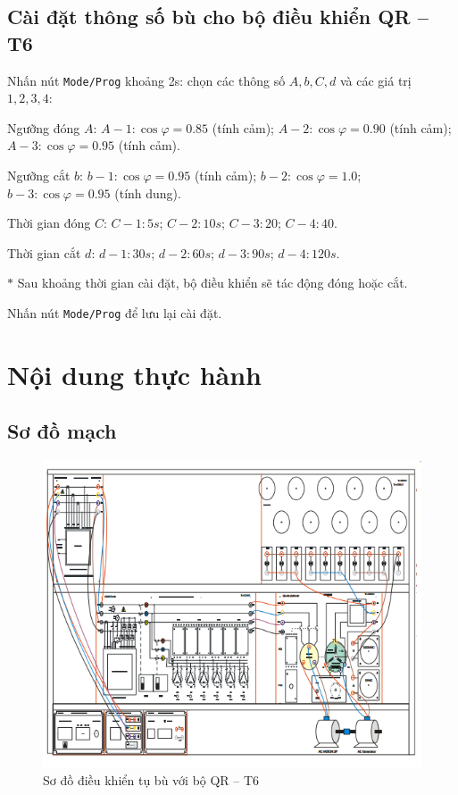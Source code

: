 \documentclass[13pt,a4paper]{extarticle}
\begin{document}
\subsection{Cài đặt thông số bù cho bộ điều khiển QR -- T6}
Nhấn nút \verb|Mode/Prog| khoảng 2s: chọn các thông số $A,b,C,d$ và các giá trị $1,2,3,4$:
\begin{list}{--}{}
\item Ngưỡng đóng $A$: $A-1:\cos \varphi  = 0.85$ (tính cảm); $A-2:\cos \varphi  = 0.90$ (tính cảm); $A-3:\cos \varphi  = 0.95$ (tính cảm).
\item Ngưỡng cắt $b$: $b-1:\cos \varphi  = 0.95$ (tính cảm); $b-2:\cos \varphi  = 1.0$; $b-3:\cos \varphi  = 0.95$ (tính dung).
\item Thời gian đóng $C$: $C-1:5s$; $C-2:10s$; $C-3:20$; $C-4:40$.
\item Thời gian cắt $d$: $d-1:30s$; $d-2:60s$; $d-3:90s$; $d-4:120s$.
\item[$\ast$] Sau khoảng thời gian cài đặt, bộ điều khiển sẽ tác động đóng hoặc cắt.
\item Nhấn nút \verb|Mode/Prog| để lưu lại cài đặt.
\end{list}
\section{Nội dung thực hành}
\subsection{Sơ đồ mạch}
\begin{figure}[!h]
\begin{center}
\includegraphics[scale=.8]{1}
\end{center}
\caption{Sơ đồ điều khiển tụ bù với bộ QR -- T6}
\end{figure}
\end{document}
